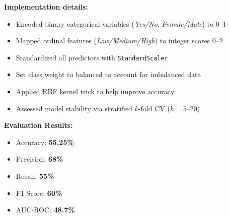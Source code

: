 \documentclass[11pt,a4paper]{article}
\begin{document}
\begin{tcolorbox}[
        title=Visualization and Model Evaluation,
        colback=mediumblue!30,
        colframe=darkblue,
        boxrule=0.5pt,
        fonttitle=\bfseries\sffamily\footnotesize,
        fontupper=\footnotesize
    ]
    \textbf{Implementation details:}
    \begin{itemize}[leftmargin=*, itemsep=2pt, parsep=0pt]
        \item Encoded binary categorical variables (\textit{Yes/No}, \textit{Female/Male}) to  \numrange{0}{1}
        \item Mapped ordinal features (\textit{Low/Medium/High}) to integer scores \numrange{0}{2}
        \item Standardized all predictors with \texttt{StandardScaler}
        \item Set class weight to balanced to account for imbalanced data
        \item Applied RBF kernel trick to help improve accuracy
        \item Assessed model stability via stratified $k$-fold CV ($k\!=\!5\text{–}20$)
    \end{itemize}

    \textbf{Evaluation Results:}
    \begin{itemize}[leftmargin=*, itemsep=2pt, parsep=0pt]
      \item Accuracy: \textbf{55.25\%}
      \item Precision: \textbf{68\%}
      \item Recall: \textbf{55\%}
      \item F1 Score: \textbf{60\%}
      \item AUC-ROC: \textbf{48.7\%}
    \end{itemize}
\end{tcolorbox}
\end{document}
